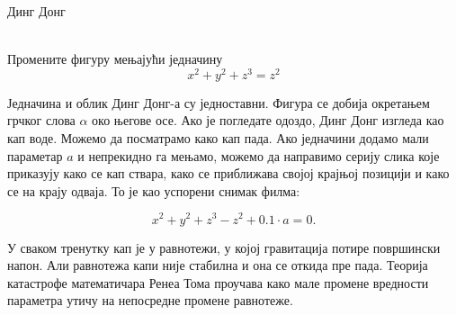 \documentclass[sr]{./../../common/SurferDesc}%
\begin{document}
\footnotesize

\begin{surferPage}
  \begin{surferTitle}Динг Донг\end{surferTitle}  \\
Промените фигуру мењајући једначину\\

\smallskip
\[x^2	+ y^2	+ z^3	= z^2\]

\singlespacing
Једначина и облик Динг Донг-а су једноставни. Фигура се добија окретањем грчког слова $\alpha$ око његове осе. Ако је погледате одоздо, Динг Донг изгледа као кап воде. Можемо да посматрамо како кап пада.
\newline
Ако једначини додамо мали параметар $a$ и непрекидно га мењамо, можемо да направимо серију слика које приказују како се кап ствара, како се приближава својој крајњој позицији и како се на крају одваја. То је као успорени снимак филма:

\[x^2	+ y^2	+ z^3	-z^2+0.1\cdot a=0.\]

У сваком тренутку кап је у равнотежи, у којој гравитација потире површински напон. Али равнотежа капи није стабилна и она се откида пре пада. Теорија катастрофе математичара Ренеа Тома проучава како мале промене вредности параметра утичу на непосредне промене равнотеже. 



  \begin{surferText}
     \end{surferText}
\end{surferPage}


\end{document}
